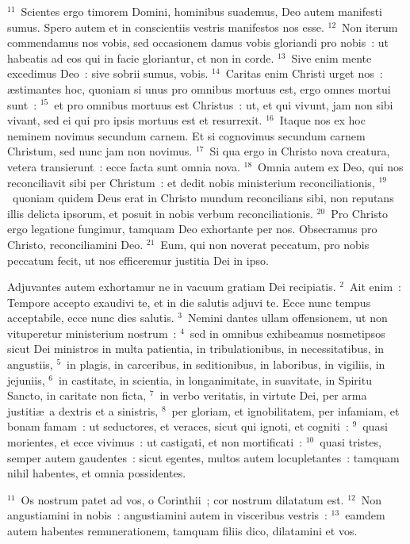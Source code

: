 ${}^{11}$~Scientes ergo timorem Domini, hominibus suademus, Deo autem manifesti sumus. Spero autem et in conscientiis vestris manifestos nos esse.
${}^{12}$~Non iterum commendamus nos vobis, sed occasionem damus vobis gloriandi pro nobis~: ut habeatis ad eos qui in facie gloriantur, et non in corde.
${}^{13}$~Sive enim mente excedimus Deo~: sive sobrii sumus, vobis.
${}^{14}$~Caritas enim Christi urget nos~: \ae stimantes hoc, quoniam si unus pro omnibus mortuus est, ergo omnes mortui sunt~:
${}^{15}$~et pro omnibus mortuus est Christus~: ut, et qui vivunt, jam non sibi vivant, sed ei qui pro ipsis mortuus est et resurrexit.
${}^{16}$~Itaque nos ex hoc neminem novimus secundum carnem. Et si cognovimus secundum carnem Christum, sed nunc jam non novimus.
${}^{17}$~Si qua ergo in Christo nova creatura, vetera transierunt~: ecce facta sunt omnia nova.
${}^{18}$~Omnia autem ex Deo, qui nos reconciliavit sibi per Christum~: et dedit nobis ministerium reconciliationis,
${}^{19}$~quoniam quidem Deus erat in Christo mundum reconcilians sibi, non reputans illis delicta ipsorum, et posuit in nobis verbum reconciliationis.
${}^{20}$~Pro Christo ergo legatione fungimur, tamquam Deo exhortante per nos. Obsecramus pro Christo, reconciliamini Deo.
${}^{21}$~Eum, qui non noverat peccatum, pro nobis peccatum fecit, ut nos efficeremur justitia Dei in ipso.

\bchapter
\lettrine[lines=3,image=true,loversize=0.05,lraise=-0.03]{A}{}djuvantes autem exhortamur ne in vacuum gratiam Dei recipiatis.
${}^{2}$~Ait enim~: Tempore accepto exaudivi te, et in die salutis adjuvi te. Ecce nunc tempus acceptabile, ecce nunc dies salutis.
${}^{3}$~Nemini dantes ullam offensionem, ut non vituperetur ministerium nostrum~:
${}^{4}$~sed in omnibus exhibeamus nosmetipsos sicut Dei ministros in multa patientia, in tribulationibus, in necessitatibus, in angustiis,
${}^{5}$~in plagis, in carceribus, in seditionibus, in laboribus, in vigiliis, in jejuniis,
${}^{6}$~in castitate, in scientia, in longanimitate, in suavitate, in Spiritu Sancto, in caritate non ficta,
${}^{7}$~in verbo veritatis, in virtute Dei, per arma justiti\ae\ a dextris et a sinistris,
${}^{8}$~per gloriam, et ignobilitatem, per infamiam, et bonam famam~: ut seductores, et veraces, sicut qui ignoti, et cogniti~:
${}^{9}$~quasi morientes, et ecce vivimus~: ut castigati, et non mortificati~:
${}^{10}$~quasi tristes, semper autem gaudentes~: sicut egentes, multos autem locupletantes~: tamquam nihil habentes, et omnia possidentes.


${}^{11}$~Os nostrum patet ad vos, o Corinthii~; cor nostrum dilatatum est.
${}^{12}$~Non angustiamini in nobis~: angustiamini autem in visceribus vestris~:
${}^{13}$~eamdem autem habentes remunerationem, tamquam filiis dico, dilatamini et vos.


